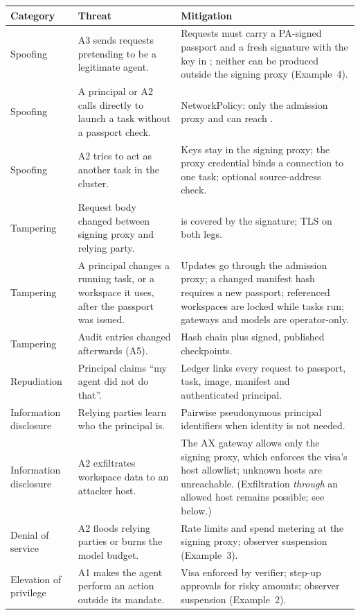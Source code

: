 \begin{table}[H]
\small
\begin{tabularx}{\linewidth}{@{}L{2.1cm}L{4.4cm}Y@{}}
\toprule
\textbf{Category} & \textbf{Threat} & \textbf{Mitigation}\\
\midrule
Spoofing & A3 sends requests pretending to be a legitimate agent. & Requests must carry a PA-signed passport and a fresh signature with the key in ; neither can be produced outside the signing proxy (Example~4).\\
Spoofing & A principal or A2 calls  directly to launch a task without a passport check. & NetworkPolicy: only the admission proxy and  can reach .\\
Spoofing & A2 tries to act as another task in the cluster. & Keys stay in the signing proxy; the proxy credential binds a connection to one task; optional source-address check.\\
Tampering & Request body changed between signing proxy and relying party. &  is covered by the signature; TLS on both legs.\\
Tampering & A principal changes a running task, or a workspace it uses, after the passport was issued. & Updates go through the admission proxy; a changed manifest hash requires a new passport; referenced workspaces are locked while tasks run; gateways and models are operator-only.\\
Tampering & Audit entries changed afterwards (A5). & Hash chain plus signed, published checkpoints.\\
Repudiation & Principal claims ``my agent did not do that''. & Ledger links every request to passport, task, image, manifest and authenticated principal.\\
Information disclosure & Relying parties learn who the principal is. & Pairwise pseudonymous principal identifiers when identity is not needed.\\
Information disclosure & A2 exfiltrates workspace data to an attacker host. & The AX gateway allows only the signing proxy, which enforces the visa's host allowlist; unknown hosts are unreachable. (Exfiltration \emph{through} an allowed host remains possible; see below.)\\
Denial of service & A2 floods relying parties or burns the model budget. & Rate limits and spend metering at the signing proxy; observer suspension (Example~3).\\
Elevation of privilege & A1 makes the agent perform an action outside its mandate. & Visa enforced by verifier; step-up approvals for risky amounts; observer suspension (Example~2).\\

\end{tabularx}
\end{table}

